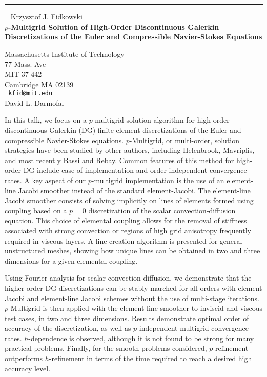 \documentclass{report}
\begin{document}
\begin{center}

\rule{6in}{1pt} \
{\large
Krzysztof J. Fidkowski
\\ {\bf
$p$-Multigrid Solution of High-Order Discontinuous Galerkin
Discretizations of the Euler and Compressible Navier-Stokes Equations
}}

Massachusetts Institute of Technology \\
77 Mass. Ave \\
MIT 37-442 \\
Cambridge MA 02139
\\ {\tt
kfid@mit.edu
}
\\
David L. Darmofal
\end{center}

In this talk, we focus on a $p$-multigrid solution algorithm for
high-order discontinuous Galerkin (DG) finite element discretizations
of the Euler and compressible Navier-Stokes equations. $p$-Multigrid, or
multi-order, solution strategies have been studied by other authors,
including Helenbrook, Mavriplis, and most recently Bassi and Rebay.
Common features of this method for high-order DG include ease of
implementation and order-independent convergence rates. A key aspect of
our $p$-multigrid implementation is the use of an element-line Jacobi
smoother instead of the standard element-Jacobi. The element-line
Jacobi smoother consists of solving implicitly on lines of elements
formed using coupling based on a $p=0$ discretization of the scalar
convection-diffusion equation. This choice of elemental coupling allows
for the removal of stiffness associated with strong convection or
regions of high grid anisotropy frequently required in viscous layers.
A line creation algorithm is presented for general unstructured meshes,
showing how unique lines can be obtained in two and three dimensions
for a given elemental coupling.

Using Fourier analysis for scalar convection-diffusion, we demonstrate
that the higher-order DG discretizations can be stably marched for all
orders with element Jacobi and element-line Jacobi schemes without the
use of multi-stage iterations. $p$-Multigrid is then applied with the
element-line smoother to inviscid and viscous test cases, in two and
three dimensions. Results demonstrate optimal order of accuracy of the
discretization, as well as $p$-independent multigrid convergence rates.
$h$-dependence is observed, although it is not found to be strong for
many practical problems. Finally, for the smooth problems considered,
$p$-refinement outperforms $h$-refinement in terms of the time required to
reach a desired high accuracy level.
\end{document}
